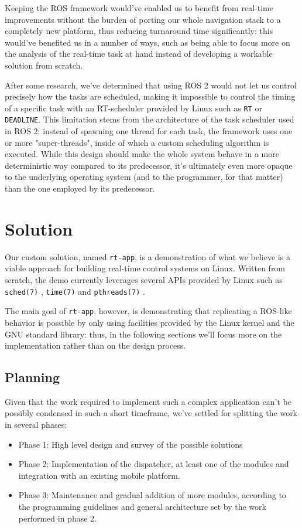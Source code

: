 \documentclass[a4paper,12pt]{report}
\begin{document}
Keeping the ROS framework would've enabled us to benefit from real-time improvements without the burden of porting our whole navigation stack to a completely new platform, thus reducing turnaround time significantly: this would've benefited us in a number of ways, such as being able to focus more on the analysis of the real-time task at hand instead of developing a workable solution from scratch.

After some research, we've determined that using ROS 2 would not let us control precisely how the tasks are scheduled, making it impossible to control the timing of a specific task with an RT-scheduler provided by Linux such as \texttt{RT} or \texttt{DEADLINE}. This limitation stems from the architecture of the task scheduler used in ROS 2: instead of spawning one thread for each task, the framework uses one or more "super-threads", inside of which a custom scheduling algorithm is executed. While this design should make the whole system behave in a more deterministic way compared to its predecessor, it's ultimately even more opaque to the underlying operating system (and to the programmer, for that matter) than the one employed by its predecessor.

\newpage
\chapter{Solution}

Our custom solution, named \texttt{rt-app}, is a demonstration of what we believe is a viable approach for building real-time control systems on Linux. Written from scratch, the demo currently leverages several APIs provided by Linux such as \texttt{sched(7)} \cite{man-sched-7}, \texttt{time(7)} \cite{man-time-7} and \texttt{pthreads(7)} \cite{man-pthreads-7}.

The main goal of \texttt{rt-app}, however, is demonstrating that replicating a ROS-like behavior is possible by only using facilities provided by the Linux kernel and the GNU standard library: thus, in the following sections we'll focus more on the implementation rather than on the design process.

\section{Planning}

Given that the work required to implement such a complex application can't be possibly condensed in such a short timeframe, we've settled for splitting the work in several phases:
\begin{itemize}
  \item Phase 1: High level design and survey of the possible solutions
  \item Phase 2: Implementation of the dispatcher, at least one of the modules and integration with an existing mobile platform.
  \item Phase 3: Maintenance and gradual addition of more modules, according to the programming guidelines and general architecture set by the work performed in phase 2.
\end{itemize}
\end{document}
